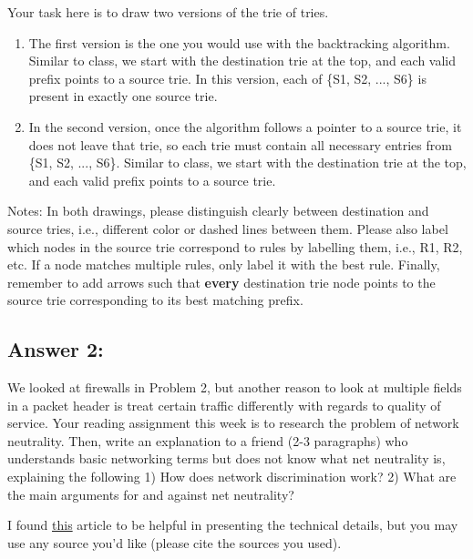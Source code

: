 \documentclass[10pt]{article}
\newenvironment{problem}[2][Problem]{\begin{trivlist}
\item[\hskip \labelsep {\bfseries #1}\hskip \labelsep {\bfseries #2.}]}{\end{trivlist}}
\begin{document}
\begin{problem}{2: Building a Firewall}
\begin{enumerate}
Your task here is to draw two versions of the trie of tries. 
\begin{enumerate}
    \item The first version is the one you would use with the backtracking algorithm. Similar to class, we start with the destination trie at the top, and each valid prefix points to a source trie. In this version, each of \{S1, S2, ..., S6\} is present in exactly one source trie.
    \item In the second version, once the algorithm follows a pointer to a source trie, it does not leave that trie, so each trie must contain all necessary entries from \{S1, S2, ..., S6\}. Similar to class, we start with the destination trie at the top, and each valid prefix points to a source trie. 
\end{enumerate}
Notes: In both drawings, please distinguish clearly between destination and source tries, i.e., different color or dashed lines between them. Please also label which nodes in the source trie correspond to rules by labelling them, i.e., R1, R2, etc. If a node matches multiple rules, only label it with the best rule. Finally, remember to add arrows such that \textbf{every} destination trie node points to the source trie corresponding to its best matching prefix.
\end{enumerate}
\end{problem}

\subsection*{Answer 2:}


\begin{problem}{3: Reading}
We looked at firewalls in Problem 2, but another reason to look at multiple fields in a packet header is treat certain traffic differently with regards to quality of service. Your reading assignment this week is to research the problem of network neutrality. Then, write an explanation to a friend (2-3 paragraphs) who understands basic networking terms but does not know what net neutrality is, explaining the following 1) How does network discrimination work? 2) What are the main arguments for and against net neutrality?

I found \href{https://www.cs.princeton.edu/courses/archive/fall21/cos109/neutrality.pdf}{this} article to be helpful in presenting the technical details, but you may use any source you'd like (please cite the sources you used).
\end{problem}
\end{document}
